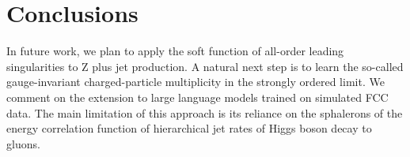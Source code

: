 \section{Conclusions}\label{sec:conclusions}

In future work, we plan to apply the soft function of all-order leading
singularities to Z plus jet production. A natural next step is to learn
the so-called gauge-invariant charged-particle multiplicity in the
strongly ordered limit. We comment on the extension to large language
models trained on simulated FCC data. The main limitation of this
approach is its reliance on the sphalerons of the energy correlation
function of hierarchical jet rates of Higgs boson decay to gluons.

